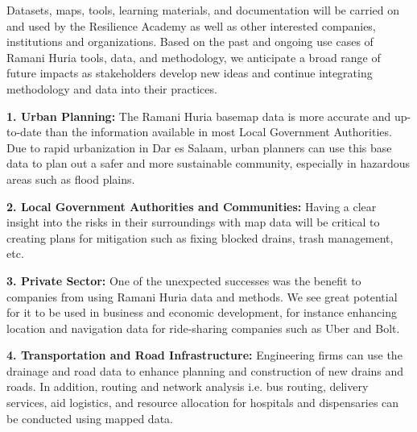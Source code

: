 \documentclass[a4paper,12pt,twoside]{article}
\begin{document}
\begin{multicols}{2}
Datasets, maps, tools, learning materials, and documentation will be carried on and used by the Resilience Academy as well as other interested companies, institutions and organizations. Based on the past and ongoing use cases of Ramani Huria tools, data, and methodology, we anticipate a broad range of future impacts as stakeholders develop new ideas and continue integrating methodology and data into their practices. 

    
\textbf{1. Urban Planning:} The Ramani Huria basemap data is more accurate and up-to-date than the information available in most Local Government Authorities. Due to rapid urbanization in Dar es Salaam, urban planners can use this base data to plan out a safer and more sustainable community, especially in hazardous areas such as flood plains.

\textbf{2. Local Government Authorities and Communities:} Having a clear insight into the risks in their surroundings with map data will be critical  to creating plans for mitigation such as fixing blocked drains, trash management, etc.

\textbf{3. Private Sector:} One of the unexpected successes was the benefit to companies from using Ramani Huria data and methods. We see great potential for it to be used in business and economic development, for instance enhancing location and navigation data for ride-sharing companies such as Uber and Bolt.

\textbf{4. Transportation and Road Infrastructure:} Engineering firms can use the drainage and road data to enhance planning and construction of new drains and roads. In addition,  routing and network analysis i.e. bus routing, delivery services, aid logistics, and resource allocation for hospitals and dispensaries can be conducted using mapped data.  
\end{multicols}


\newpage
\end{document}
